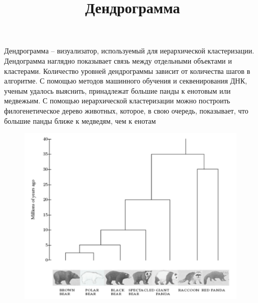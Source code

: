 \documentclass[12pt, a4paper]{article}
\title{Дендрограмма}
\date{}
\begin{document}
\maketitle
\hspace{0.5cm} Дендрограмма – визуализатор, используемый для иерархической кластеризации. Дендограмма наглядно показывает связь между отдельными объектами и кластерами. Количество уровней дендрограммы зависит от количества шагов в алгоритме. 
С помощью методов машинного обучения и секвенирования ДНК, ученым удалось выяснить, принадлежат большие панды к енотовым или медвежьим. 
С помощью иерархической кластеризации можно построить филогенетическое дерево животных, которое, в свою очередь, показывает, что большие панды ближе к медведям, чем к енотам 

\begin{figure}[!htb]
\begin{center}
\includegraphics[width=110mm]{e.png}
\end{center}
\caption{}
\end{figure}
\end{document}

